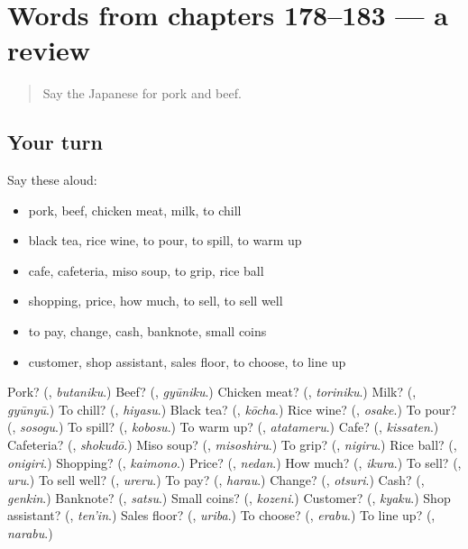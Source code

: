 \section[(dialogue)]{Words from chapters 178–183 — a review}

\label{lesson:JA-R183-review-178-183}



\begin{quote}
Say the Japanese for pork and beef.
\end{quote}

\subsection*{Your turn}
Say these aloud:

\begin{itemize}
\raggedright
  \item pork, beef, chicken meat, milk, to chill
  \item black tea, rice wine, to pour, to spill, to warm up
  \item cafe, cafeteria, miso soup, to grip, rice ball
  \item shopping, price, how much, to sell, to sell well
  \item to pay, change, cash, banknote, small coins
  \item customer, shop assistant, sales floor, to choose, to line up
\end{itemize}

\begin{tcolorbox}[breakable,colback=teal!4,colframe=teal!35!black,title={Before you move on}]
Pork? (\textbf{}, \emph{butaniku}.) Beef? (\textbf{}, \emph{gyūniku}.) Chicken meat? (\textbf{}, \emph{toriniku}.) Milk? (\textbf{}, \emph{gyūnyū}.) To chill? (\textbf{}, \emph{hiyasu}.) Black tea? (\textbf{}, \emph{kōcha}.) Rice wine? (\textbf{}, \emph{osake}.) To pour? (\textbf{}, \emph{sosogu}.) To spill? (\textbf{}, \emph{kobosu}.) To warm up? (\textbf{}, \emph{atatameru}.) Cafe? (\textbf{}, \emph{kissaten}.) Cafeteria? (\textbf{}, \emph{shokudō}.) Miso soup? (\textbf{}, \emph{misoshiru}.) To grip? (\textbf{}, \emph{nigiru}.) Rice ball? (\textbf{}, \emph{onigiri}.) Shopping? (\textbf{}, \emph{kaimono}.) Price? (\textbf{}, \emph{nedan}.) How much? (\textbf{}, \emph{ikura}.) To sell? (\textbf{}, \emph{uru}.) To sell well? (\textbf{}, \emph{ureru}.) To pay? (\textbf{}, \emph{harau}.) Change? (\textbf{}, \emph{otsuri}.) Cash? (\textbf{}, \emph{genkin}.) Banknote? (\textbf{}, \emph{satsu}.) Small coins? (\textbf{}, \emph{kozeni}.) Customer? (\textbf{}, \emph{kyaku}.) Shop assistant? (\textbf{}, \emph{ten'in}.) Sales floor? (\textbf{}, \emph{uriba}.) To choose? (\textbf{}, \emph{erabu}.) To line up? (\textbf{}, \emph{narabu}.)
\end{tcolorbox}
